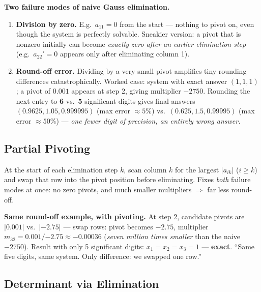 \begin{keypoint}
\textbf{Two failure modes of naive Gauss elimination.}
\begin{enumerate}
\item \textbf{Division by zero.} E.g.\ $a_{11}=0$ from the start — nothing to pivot on, even though the system is perfectly solvable. Sneakier version: a pivot that is nonzero initially can become \emph{exactly zero after an earlier elimination step} (e.g.\ $a_{22}'=0$ appears only after eliminating column 1).
\item \textbf{Round-off error.} Dividing by a very small pivot amplifies tiny rounding differences catastrophically. Worked case: system with exact answer $(1,1,1)$; a pivot of $0.001$ appears at step 2, giving multiplier $-2750$. Rounding the next entry to \textbf{6} vs.\ \textbf{5} significant digits gives final answers $(0.9625,1.05,0.999995)$ (max error $\approx5\%$) vs.\ $(0.625,1.5,0.99995)$ (max error $\approx50\%$) — \emph{one fewer digit of precision, an entirely wrong answer.}
\end{enumerate}
\end{keypoint}

\subsection{Partial Pivoting}

\begin{defbox}
At the start of each elimination step $k$, scan column $k$ for the largest $|a_{ik}|$ ($i\ge k$) and swap that row into the pivot position before eliminating. Fixes \emph{both} failure modes at once: no zero pivots, and much smaller multipliers $\Rightarrow$ far less round-off.
\end{defbox}

\begin{examplebox}
\textbf{Same round-off example, with pivoting.} At step 2, candidate pivots are $|0.001|$ vs.\ $|-2.75|$ — swap rows: pivot becomes $-2.75$, multiplier $m_{32}=0.001/{-2.75}\approx-0.00036$ (\emph{seven million times smaller} than the naive $-2750$). Result with only 5 significant digits: $x_1=x_2=x_3=1$ — \textbf{exact}. ``Same five digits, same system. Only difference: we swapped one row.''
\end{examplebox}

\subsection{Determinant via Elimination}

